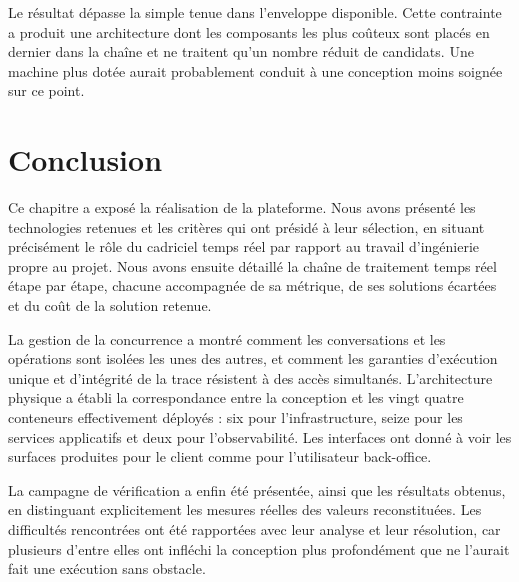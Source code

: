 Le résultat dépasse la simple tenue dans l'enveloppe disponible. Cette contrainte a produit une architecture dont les composants les plus coûteux sont placés en dernier dans la chaîne et ne traitent qu'un nombre réduit de candidats. Une machine plus dotée aurait probablement conduit à une conception moins soignée sur ce point.

\section*{Conclusion}

Ce chapitre a exposé la réalisation de la plateforme. Nous avons présenté les technologies retenues et les critères qui ont présidé à leur sélection, en situant précisément le rôle du cadriciel temps réel par rapport au travail d'ingénierie propre au projet. Nous avons ensuite détaillé la chaîne de traitement temps réel étape par étape, chacune accompagnée de sa métrique, de ses solutions écartées et du coût de la solution retenue.

La gestion de la concurrence a montré comment les conversations et les opérations sont isolées les unes des autres, et comment les garanties d'exécution unique et d'intégrité de la trace résistent à des accès simultanés. L'architecture physique a établi la correspondance entre la conception et les vingt quatre conteneurs effectivement déployés : six pour l'infrastructure, seize pour les services applicatifs et deux pour l'observabilité. Les interfaces ont donné à voir les surfaces produites pour le client comme pour l'utilisateur back-office.

La campagne de vérification a enfin été présentée, ainsi que les résultats obtenus, en distinguant explicitement les mesures réelles des valeurs reconstituées. Les difficultés rencontrées ont été rapportées avec leur analyse et leur résolution, car plusieurs d'entre elles ont infléchi la conception plus profondément que ne l'aurait fait une exécution sans obstacle.
